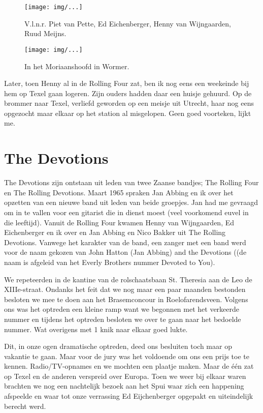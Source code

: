 \documentclass[10pt,twoside,openright]{memoir}
\begin{document}
\begin{figure}[t]
\texttt{[image: img/...]}
\caption{V.l.n.r. Piet van Pette, Ed Eichenberger, Henny van Wijngaarden, Ruud Meijns.}
\end{figure}
 
\begin{figure}[t]
\texttt{[image: img/...]}
\caption{In het Moriaanshoofd in Wormer.}
\end{figure}

Later, toen Henny al in de Rolling Four zat, ben ik nog eens een weekeinde bij hem op Texel gaan logeren. Zijn ouders hadden daar een huisje gehuurd. Op de brommer naar Texel, verliefd geworden op een meisje uit Utrecht, haar nog eens opgezocht maar elkaar op het station al misgelopen. Geen goed voorteken, lijkt me.

\chapter{The Devotions} %
\label{cha:devotions}

The Devotions zijn ontstaan uit leden van twee Zaanse bandjes; The Rolling Four en The Rolling Devotions. Maart 1965 spraken Jan Abbing en ik over het opzetten van een nieuwe band uit leden van beide groepjes. Jan had me gevraagd om in te vallen voor een gitarist die in dienst moest (veel voorkomend euvel in die leeftijd). Vanuit de Rolling Four kwamen Henny van Wijngaarden, Ed Eichenberger en ik over en Jan Abbing en Nico Bakker uit The Rolling Devotions. Vanwege het karakter van de band, een zanger met een band werd voor de naam gekozen van John Hatton (Jan Abbing) and the Devotions ((de naam is afgeleid van het Everly Brothers nummer Devoted to You).

We repeteerden in de kantine van de rolschaatsbaan St. Theresia aan de Leo de XIIIe-straat. Ondanks het feit dat we nog maar een paar maanden bestonden besloten we mee te doen aan het Brasemconcour in Roelofarendsveen. Volgens ons was het optreden een kleine ramp want we begonnen met het verkeerde nummer en tijdens het optreden besloten we over te gaan naar het bedoelde nummer. Wat overigens met 1 knik naar elkaar goed lukte. 

Dit, in onze ogen dramatische optreden, deed ons besluiten toch maar op vakantie te gaan. Maar voor de jury was het voldoende om ons een prijs toe te kennen. Radio/TV-opnames en we mochten een plaatje maken. Maar de één zat op Texel en de anderen verspreid over Europa. Toen we weer bij elkaar waren brachten we nog een nachtelijk bezoek aan het Spui waar zich een happening afspeelde en waar tot onze verrassing Ed Eijchenberger opgepakt en uiteindelijk berecht werd.
\end{document}
